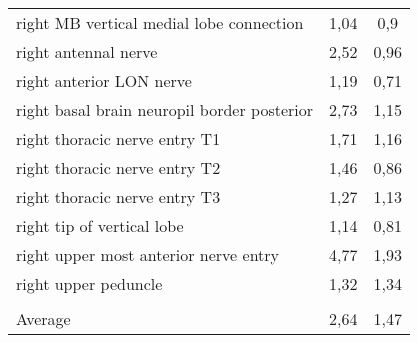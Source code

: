 \begin{tabular}{lcc}
 right MB vertical medial lobe connection    & 1,04          & 0,9              \\
 right antennal nerve                        & 2,52          & 0,96             \\
 right anterior LON nerve                    & 1,19          & 0,71             \\
 right basal brain neuropil border posterior & 2,73          & 1,15             \\
 right thoracic nerve entry T1               & 1,71          & 1,16             \\
 right thoracic nerve entry T2               & 1,46          & 0,86             \\
 right thoracic nerve entry T3               & 1,27          & 1,13             \\
 right tip of vertical lobe                  & 1,14          & 0,81             \\
 right upper most anterior nerve entry       & 4,77          & 1,93             \\
 right upper peduncle                        & 1,32          & 1,34             \\
                                             &               &                  \\
 Average                                     & 2,64          & 1,47             \\ \hline \hline
\hline
\end{tabular}